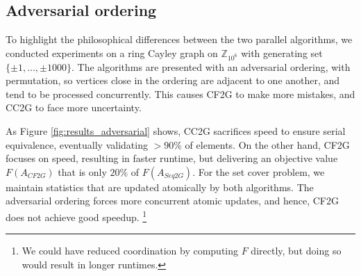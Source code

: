 \documentclass{article} %
\newcommand{\hogwild}{CF2G}
\newcommand{\occ}{CC2G}
\begin{document}
\subsection{Adversarial ordering}

To highlight the philosophical differences between the two parallel algorithms, we conducted experiments on a ring Cayley graph on $\mathbb{Z}_{10^6}$ with generating set $\{\pm 1,\dots, \pm 1000\}$.
The algorithms are presented with an adversarial ordering, with permutation, so vertices close in the ordering are adjacent to one another, and tend to be processed concurrently.
This causes \hogwild{} to make more mistakes, and \occ{} to face more uncertainty.

As Figure \ref{fig:results_adversarial} shows, \occ{}  sacrifices speed to ensure serial equivalence, eventually validating $>90\%$ of elements.
On the other hand, \hogwild{} focuses on speed, resulting in faster runtime, but delivering an objective value $F(A_{\hogwild{}})$ that is only $20\%$ of $F(A_{Seq2G})$.
For the set cover problem, we maintain statistics that are updated atomically by both algorithms.
The adversarial ordering forces more concurrent atomic updates, and hence, \hogwild{} does not achieve good speedup.
\footnote{We could have reduced coordination by computing $F$ directly, but doing so would result in longer runtimes.}
\end{document}
